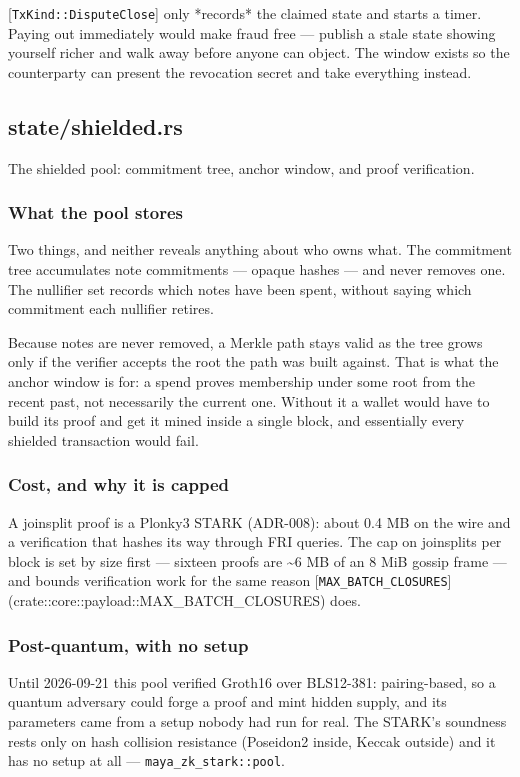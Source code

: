 \documentclass[11pt,a4paper]{article}
\begin{document}
[\texttt{TxKind::DisputeClose}] only *records* the claimed state and starts a
timer. Paying out immediately would make fraud free — publish a stale state
showing yourself richer and walk away before anyone can object. The window
exists so the counterparty can present the revocation secret and take
everything instead.

\subsection{state/shielded.rs}
The shielded pool: commitment tree, anchor window, and proof verification.

\subsubsection{What the pool stores}

Two things, and neither reveals anything about who owns what. The
commitment tree accumulates note commitments — opaque hashes — and never
removes one. The nullifier set records which notes have been spent, without
saying which commitment each nullifier retires.

Because notes are never removed, a Merkle path stays valid as the tree
grows only if the verifier accepts the root the path was built against. That
is what the anchor window is for: a spend proves membership under some root
from the recent past, not necessarily the current one. Without it a wallet
would have to build its proof and get it mined inside a single block, and
essentially every shielded transaction would fail.

\subsubsection{Cost, and why it is capped}

A joinsplit proof is a Plonky3 STARK (ADR-008): about 0.4 MB on the wire
and a verification that hashes its way through FRI queries. The cap on
joinsplits per block is set by size first — sixteen proofs are \textasciitilde{}6 MB of an
8 MiB gossip frame — and bounds verification work for the same reason
[\texttt{MAX\_BATCH\_CLOSURES}](crate::core::payload::MAX\_BATCH\_CLOSURES) does.

\subsubsection{Post-quantum, with no setup}

Until 2026-09-21 this pool verified Groth16 over BLS12-381: pairing-based,
so a quantum adversary could forge a proof and mint hidden supply, and its
parameters came from a setup nobody had run for real. The STARK's
soundness rests only on hash collision resistance (Poseidon2 inside,
Keccak outside) and it has no setup at all — \texttt{maya\_zk\_stark::pool}.
\end{document}
